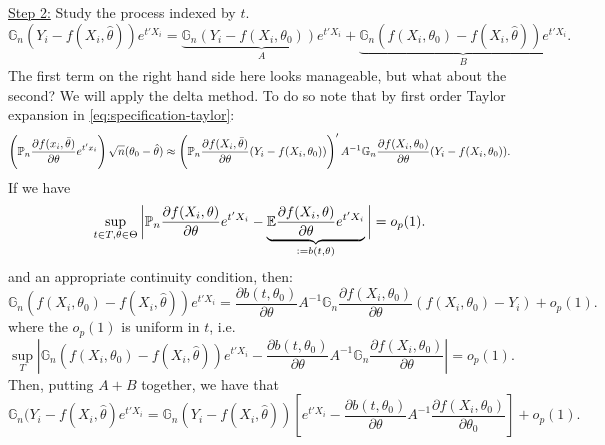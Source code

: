 \begin{example*}
	\underline{Step 2:} Study the process indexed by \(t\).
	\[
		\mathbb{G}_n (Y_i - f(X_i,\hat\theta))e^{t'X_i} = \underbrace{\mathbb{G}_n (Y_i - f(X_i,\theta_0))e^{t'X_i}}_{A} + \underbrace{\mathbb{G}_n(f(X_i,\theta_0)-f(X_i,\hat\theta))e^{t'X_i}}_{B}
	.\]
	The first term on the right hand side here looks manageable, but what about the second? We will apply the delta method. To do so note that by first order Taylor expansion in \eqref{eq:specification-taylor}:
	\[
		\left(\P_n\frac{\partial f(x_i,\bar\theta)}{\partial \theta}e^{t'x_i}\right)\sqrt{n}(\theta_0-\hat\theta) \approx  \left(\P_n\frac{\partial f(X_i,\bar\theta)}{\partial \theta}(Y_i-f(X_i,\theta_0))\right)'A^{-1}\mathbb{G}_n\frac{\partial f(X_i,\theta_0)}{\partial \theta}(Y_i-f(X_i,\theta_0))
	.\]
	If we have 
	\[
		\sup_{t\in T,\theta\in\Theta} \bigg|\P_n \frac{\partial  f(X_i,\theta)}{\partial \theta}e^{t'X_i} - \underbrace{\E\frac{\partial  f(X_i,\theta)}{\partial \theta}e^{t'X_i}}_{:=b(t,\theta)}\bigg| = o_p(1)
	.\]
	and an appropriate continuity condition, then:
	\[
		\mathbb{G}_n(f(X_i,\theta_0)-f(X_i,\hat\theta))e^{t'X_i} = \frac{\partial b(t,\theta_0)}{\partial \theta}A^{-1}\mathbb{G}_n\frac{\partial f(X_i,\theta_0)}{\partial \theta}(f(X_i,\theta_0)-Y_i) + o_p(1)
	.\] 
	where the \(o_p(1)\) is uniform in \(t\), i.e.
	\[
		\sup_T \left|\mathbb{G}_n (f(X_i,\theta_0)-f(X_i,\hat\theta))e^{t'X_i} - \frac{\partial b(t,\theta_0)}{\partial \theta}A^{-1}\mathbb{G}_n\frac{\partial f(X_i,\theta_0)}{\partial \theta}\right| = o_p(1)
	.\]
	Then, putting \(A+B\) together, we have that 
	\[
		\mathbb{G}_n(Y_i-f(X_i,\hat\theta)e^{t'X_i} = \mathbb{G}_n (Y_i - f(X_i,\hat\theta))\left[e^{t'X_i}-\frac{\partial b(t,\theta_0)}{\partial \theta}A^{-1}\frac{\partial f(X_i,\theta_0)}{\partial \theta_0}\right] + o_p(1)\tag{S2}
	.\]


\end{example*}
